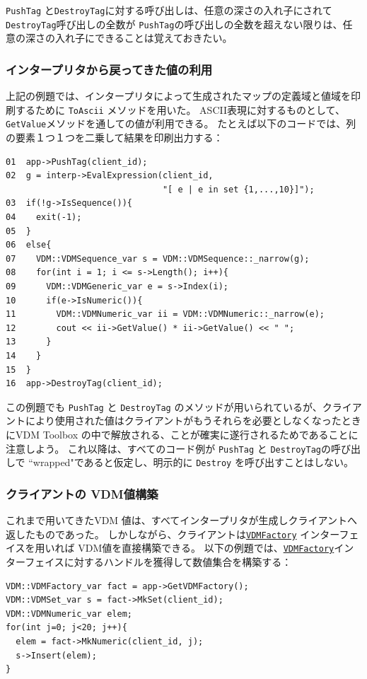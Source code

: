 \documentclass[\pformat,12pt]{jarticle}
\newcommand{\VDMFactory}{\hyperlink{interface.VDMFactory}{VDMFactory}}
\begin{document}
 {\tt PushTag} と{\tt DestroyTag}に対する呼び出しは、任意の深さの入れ子にされて
{\tt DestroyTag}呼び出しの全数が {\tt PushTag}の呼び出しの全数を超えない限りは、任意の深さの入れ子にできることは覚えておきたい。

\subsubsection{インタープリタから戻ってきた値の利用}

上記の例題では、インタープリタによって生成されたマップの定義域と値域を印刷するために {\tt ToAscii} メソッドを用いた。
ASCII表現に対するものとして、 {\tt  GetValue}メソッドを通しての値が利用できる。
たとえば以下のコードでは、列の要素１つ１つを二乗して結果を印刷出力する：

\begin{verbatim}
01  app->PushTag(client_id);
02  g = interp->EvalExpression(client_id, 
                               "[ e | e in set {1,...,10}]");
03  if(!g->IsSequence()){
04    exit(-1);
05  }
06  else{
07    VDM::VDMSequence_var s = VDM::VDMSequence::_narrow(g);
08    for(int i = 1; i <= s->Length(); i++){
09      VDM::VDMGeneric_var e = s->Index(i);
10      if(e->IsNumeric()){
11        VDM::VDMNumeric_var ii = VDM::VDMNumeric::_narrow(e);
12        cout << ii->GetValue() * ii->GetValue() << " ";
13      }
14    }
15  }
16  app->DestroyTag(client_id);
\end{verbatim}

この例題でも {\tt PushTag} と {\tt DestroyTag} のメソッドが用いられているが、クライアントにより使用された値はクライアントがもうそれらを必要としなくなったときにVDM Toolbox の中で解放される、ことが確実に遂行されるためであることに注意しよう。
これ以降は、すべてのコード例が {\tt PushTag} と {\tt DestroyTag}の呼び出しで ``wrapped"であると仮定し、明示的に {\tt Destroy} を呼び出すことはしない。

\subsubsection{クライアントの VDM値構築}

これまで用いてきたVDM 値は、すべてインタープリタが生成しクライアントへ返したものであった。
しかしながら、クライアントは{\tt \VDMFactory} インターフェイスを用いれば VDM値を直接構築できる。
以下の例題では、{\tt \VDMFactory}インターフェイスに対するハンドルを獲得して数値集合を構築する：

\begin{verbatim}
VDM::VDMFactory_var fact = app->GetVDMFactory();
VDM::VDMSet_var s = fact->MkSet(client_id);
VDM::VDMNumeric_var elem;
for(int j=0; j<20; j++){
  elem = fact->MkNumeric(client_id, j);
  s->Insert(elem);
}
\end{verbatim}
\end{document}
